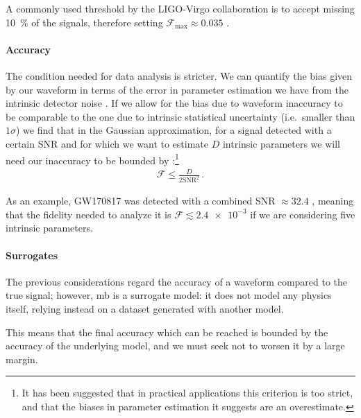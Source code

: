 \documentclass[main.tex]{subfiles}
\begin{document}
A commonly used threshold by the \ac{LIGO}-Virgo collaboration is to accept missing \SI{10}{\percent} of the signals, therefore setting \(\mathcal{F}_{\text{max}} \approx 0.035\) \cite[]{lindblomModelWaveformAccuracy2008}.

\paragraph{Accuracy}

The condition needed for data analysis is stricter.
We can quantify the bias given by our waveform in terms of the error in parameter estimation we have from the intrinsic detector noise \cites[sec.\ A]{lindblomModelWaveformAccuracy2008}[sec.\ C]{damourAccuracyEffectualnessClosedform2011}. 
If we allow for the bias due to waveform inaccuracy to be comparable to the one due to intrinsic statistical uncertainty (i.e.\ smaller than \(1 \sigma \)) we find that in the Gaussian approximation, for a signal detected with a certain \ac{SNR} and for which we want to estimate \(D\) intrinsic parameters we will need our inaccuracy to be bounded by
\cites[appendix G]{chatziioannouConstructingGravitationalWaves2017}{gambaWaveformSystematicsGravitationalwave2021}:\footnote{It has been suggested \cite[sec.\ III]{purrerGravitationalWaveformAccuracy2020} that in practical applications this criterion is too strict, and that the biases in parameter estimation it suggests are an overestimate.}
%
\begin{align}
\mathcal{F} \leq \frac{D}{2 \text{SNR}^2}
\,.
\end{align}

As an example, GW170817 was detected with a combined SNR \(\approx 32.4\) \cite[]{abbottGW170817ObservationGravitational2017}, meaning that the fidelity needed to analyze it is \(\mathcal{F} \lesssim \num{2.4e-3}\) if we are considering five intrinsic parameters.

\paragraph{Surrogates}

The previous considerations regard the accuracy of a waveform compared to the true signal; however, \ac{mb} is a surrogate model: it does not model any physics itself, relying instead on a dataset generated with another model. 

This means that the final accuracy which can be reached is bounded by the accuracy of the underlying model, and we must seek not to worsen it by a large margin.
\end{document}
